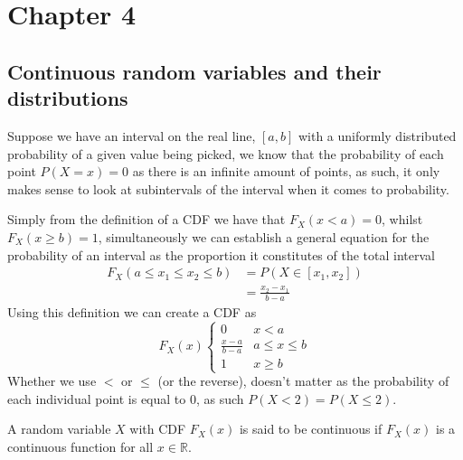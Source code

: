 \section{Chapter 4}
\subsection{Continuous random variables and their distributions}
Suppose we have an interval on the real line, $[a,b]$ with a uniformly distributed probability of a given value being picked, we know that the probability of each point $P(X=x)=0$ as there is an infinite amount of points, as such, it only makes sense to look at subintervals of the interval when it comes to probability. 

Simply from the definition of a CDF we have that $F_{X}(x<a)=0$, whilst $F_{X}(x\geq b)=1$, simultaneously we can establish a general equation for the probability of an interval as the proportion it constitutes of the total interval
\begin{align*}
    F_{X}(a\leq x_{1}\leq x_{2}\leq b)&=P(X\in[x_{1},x_{2}]) \\
                       &=\frac{x_{2}-x_{1}}{b-a}
\end{align*}
Using this definition we can create a CDF as
\[
    F_{X}(x)\begin{cases}0 & x<a \\ \frac{x-a}{b-a} & a\leq x\leq b \\ 1 & x\geq b\end{cases}
    
\]
Whether we use $<$ or $\leq$ (or the reverse), doesn't matter as the probability of each individual point is equal to 0, as such $P(X<2)=P(X\leq 2)$.
\begin{definition}
  A random variable $X$ with CDF $F_{X}(x)$ is said to be continuous if $F_{X}(x)$ is a continuous function for all $x\in \mathbb{R}$.
\end{definition}
